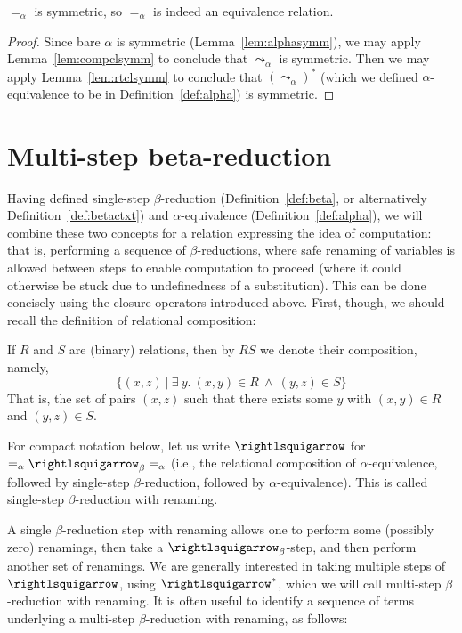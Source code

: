 \begin{corollary}
  $=_\alpha$ is symmetric, so $=_\alpha$ is indeed an equivalence relation.
\end{corollary}
\begin{proof}
  Since bare $\alpha$ is symmetric (Lemma~\ref{lem:alphasymm}), we may apply Lemma~\ref{lem:compclsymm} to conclude
  that $\leadsto_\alpha$ is symmetric.  Then we may apply Lemma~\ref{lem:rtclsymm} to conclude that $(\leadsto_\alpha)^*$ (which
  we defined $\alpha$-equivalence to be in Definition~\ref{def:alpha}) is
  symmetric.
\end{proof}


\section{Multi-step beta-reduction}
\label{sec:multibeta}

Having defined single-step $\beta$-reduction
(Definition~\ref{def:beta}, or alternatively
Definition~\ref{def:betactxt}) and $\alpha$-equivalence
(Definition~\ref{def:alpha}), we will combine these two concepts for a
relation expressing the idea of computation: that is, performing a
sequence of $\beta$-reductions, where safe renaming of variables is
allowed between steps to enable computation to proceed (where it could
otherwise be stuck due to undefinedness of a substitution).  This can
be done concisely using the closure operators introduced above.
First, though, we should recall the definition of relational
composition:

\begin{definition}
  If $R$ and $S$ are (binary) relations, then by $R S$ we denote their
  composition, namely,
  \[
  \{ (x,z)\ |\ \exists\ y.\ (x,y)\in R \ \wedge\ (y,z) \in S \}
  \]
  \noindent That is, the set of pairs $(x,z)$ such that there exists some $y$ with
  $(x,y) \in R$ and $(y,z)\in S$.
\end{definition}

\begin{definition}
  For compact notation below, let us write $\betaa$ for $=_\alpha \betar =_\alpha$
  (i.e., the relational composition of
$\alpha$-equivalence, followed by single-step $\beta$-reduction,
followed by $\alpha$-equivalence).  This is called single-step
$\beta$-reduction with renaming.
\end{definition}

A single $\beta$-reduction step with renaming allows one to perform some (possibly zero)
renamings, then take a $\betar$-step, and then perform another set of renamings.
We are generally interested in taking multiple steps of $\betaa$, using $\betaa^*$, which
we will call multi-step $\beta$-reduction with renaming.
It is often useful to identify a sequence of terms underlying a
multi-step $\beta$-reduction with renaming, as follows:

